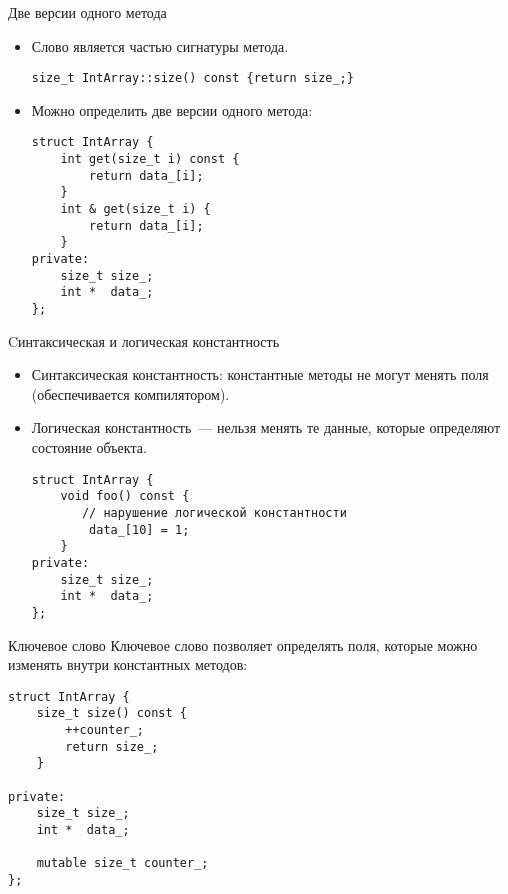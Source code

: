\documentclass{beamer}
\begin{document}
\begin{frame}[fragile]{Две версии одного метода}{}
    \begin{itemize}
        \item Слово  является частью сигнатуры метода.
\begin{lstlisting}
size_t IntArray::size() const {return size_;}
\end{lstlisting}
        \item Можно определить две версии одного метода:
\begin{lstlisting}
struct IntArray {
    int get(size_t i) const { 
        return data_[i]; 
    }
    int & get(size_t i) { 
        return data_[i]; 
    }
private:
    size_t size_;
    int *  data_;
};
\end{lstlisting}

    \end{itemize}
\end{frame}

\begin{frame}[fragile]{Cинтаксическая и логическая константность}{}
\begin{itemize}
    \item Синтаксическая константность: константные методы
        не могут менять поля (обеспечивается компилятором).
    \item Логическая константность~--- нельзя менять те данные, 
        которые определяют состояние объекта.
\begin{lstlisting}
struct IntArray {
    void foo() const {
       // нарушение логической константности
        data_[10] = 1; 
    }
private:
    size_t size_;
    int *  data_;
};
\end{lstlisting}
\end{itemize}
    
\end{frame}


\begin{frame}[fragile]{Ключевое слово }{}
Ключевое слово  позволяет определять поля,
которые можно изменять внутри константных методов:
\begin{lstlisting}
struct IntArray {
    size_t size() const { 
        ++counter_;
        return size_; 
    }

private:
    size_t size_;
    int *  data_;

    mutable size_t counter_;
};
\end{lstlisting}
\end{frame}
\end{document}
